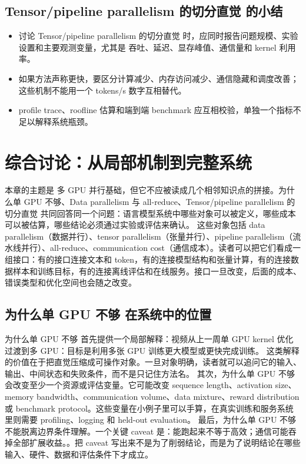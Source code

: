 \documentclass[a4paper]{article}
\begin{document}
\subsection{Tensor/pipeline parallelism 的切分直觉 的小结}
\begin{itemize}
\item 讨论 Tensor/pipeline parallelism 的切分直觉 时，应同时报告问题规模、实验设置和主要观测变量，尤其是 吞吐、延迟、显存峰值、通信量和 kernel 利用率。
\item 如果方法声称更快，要区分计算减少、内存访问减少、通信隐藏和调度改善；这些机制不能用一个 tokens/s 数字互相替代。
\item profile trace、roofline 估算和端到端 benchmark 应互相校验，单独一个指标不足以解释系统瓶颈。
\end{itemize}
\section{综合讨论：从局部机制到完整系统}
本章的主题是 多 GPU 并行基础，但它不应被读成几个相邻知识点的拼接。为什么单 GPU 不够、Data parallelism 与 all-reduce、Tensor/pipeline parallelism 的切分直觉 共同回答同一个问题：语言模型系统中哪些对象可以被定义，哪些成本可以被估算，哪些结论必须通过实验或评估来确认。
这些对象包括 data parallelism（数据并行）、tensor parallelism（张量并行）、pipeline parallelism（流水线并行）、all-reduce、communication cost（通信成本）。读者可以把它们看成一组接口：有的接口连接文本和 token，有的连接模型结构和张量计算，有的连接数据样本和训练目标，有的连接离线评估和在线服务。接口一旦改变，后面的成本、错误类型和优化空间也会随之改变。
\subsection{为什么单 GPU 不够 在系统中的位置}
为什么单 GPU 不够 首先提供一个局部解释：视频从上一周单 GPU kernel 优化过渡到多 GPU：目标是利用多张 GPU 训练更大模型或更快完成训练。 这类解释的价值在于把直觉压缩成可操作对象。一旦对象明确，读者就可以追问它的输入、输出、中间状态和失败条件，而不是只记住方法名。
其次，为什么单 GPU 不够 会改变至少一个资源或评估变量。它可能改变 sequence length、activation size、memory bandwidth、communication volume、data mixture、reward distribution 或 benchmark protocol。这些变量在小例子里可以手算，在真实训练和服务系统里则需要 profiling、logging 和 held-out evaluation。
最后，为什么单 GPU 不够 不能脱离边界条件理解。一个关键 caveat 是：能跑起来不等于高效；通信可能吞掉全部扩展收益。。把 caveat 写出来不是为了削弱结论，而是为了说明结论在哪些输入、硬件、数据和评估条件下才成立。
\end{document}
